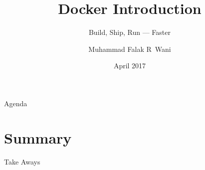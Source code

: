 \documentclass{beamer}
\title{Docker Introduction}
\subtitle{Build, Ship, Run --- Faster}
\author{Muhammad Falak R~Wani \\ \inst{falakreyaz@gmail.com}}
\institute[IIIT-D] %
{
  Cybersecurity Education and Research Centre -- {\em (CERC)} \\
  Department of Computer Science\\
  IIIT-D\\
  \centering
  \pgfuseimage{cerc-logo}

}
\date{April 2017}
\begin{document}
\begin{frame}
	\titlepage
\end{frame}

\begin{frame}{Agenda}
	\tableofcontents
\end{frame}

\section*{Summary}

\begin{frame}{Take Aways}
\end{frame}



\end{document}
